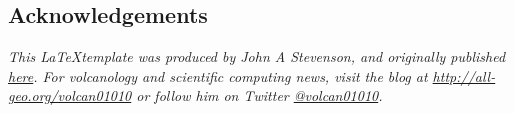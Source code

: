 \documentclass[a4paper,11pt]{article}
\begin{document}
\nocite{stevenson_uk_2013,stevenson_widespread_2011,stevenson_volcano-ice_2005,stevenson_subglacial_2006,stevenson_distal_2012,stevenson_despeckling_2010}

\def\bibfont{\scriptsize}
\begin{multicols}{2}

\end{multicols}

\subsection*{Acknowledgements}
\textit{This \LaTeX template was produced by John A Stevenson, and originally published \href{http://all-geo.org/volcan01010/2013/07/grant-applications-are-hard-work-includes-latex-template}{here}.  For volcanology and scientific computing news, visit the blog at \href{http://all-geo.org/volcan01010}{http://all-geo.org/volcan01010} or follow him on Twitter \href{https://twitter.com/volcan01010}{@volcan01010}.}
\end{document}
